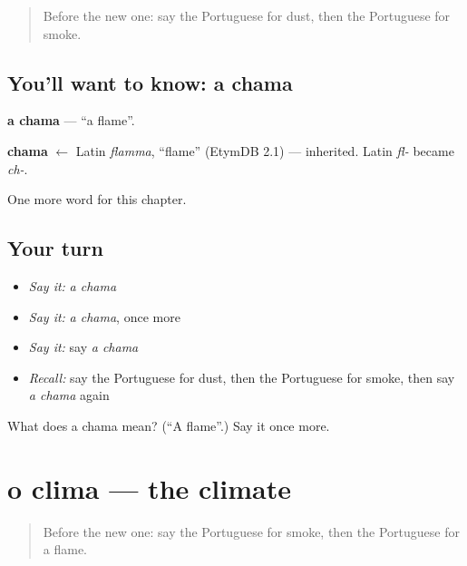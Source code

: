 \label{lesson:PT-C195-chama}



\begin{quote}
Before the new one: say the Portuguese for dust, then the Portuguese for smoke.
\end{quote}

\subsection*{You'll want to know: a chama}
\textbf{a chama} — \textquotedblleft{}a flame\textquotedblright{}.

\begin{cousinweb}
\textbf{chama} $\leftarrow$ Latin \emph{flamma}, \textquotedblleft{}flame\textquotedblright{} (EtymDB 2.1) — inherited. Latin \emph{fl-} became \emph{ch-}.
\end{cousinweb}

\begin{grammarlens}[title={What you've built}]
One more word for this chapter.
\end{grammarlens}

\subsection*{Your turn}
\begin{itemize}
\raggedright
  \item \emph{Say it:} \emph{a chama}
  \item \emph{Say it:} \emph{a chama}, once more
  \item \emph{Say it:} say \emph{a chama}
  \item \emph{Recall:} say the Portuguese for dust, then the Portuguese for smoke, then say \emph{a chama} again
\end{itemize}

\begin{tcolorbox}[breakable,colback=teal!4,colframe=teal!35!black,title={Before you move on}]
What does a chama mean? (\textquotedblleft{}A flame\textquotedblright{}.) Say it once more.
\end{tcolorbox}
\section[o clima]{o clima — the climate}

\label{lesson:PT-C195-clima}



\begin{quote}
Before the new one: say the Portuguese for smoke, then the Portuguese for a flame.
\end{quote}


